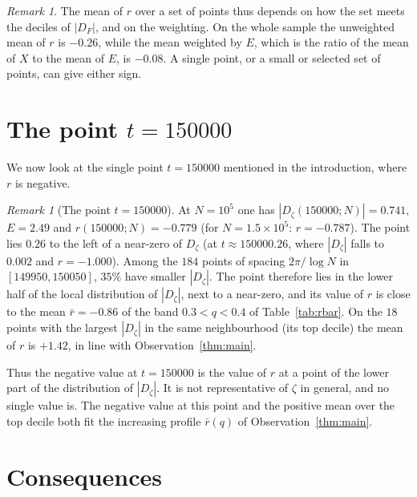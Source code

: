 \documentclass[11pt]{amsart}
\theoremstyle{definition}
\theoremstyle{remark}
\newtheorem{remark}[theorem]{Remark}
\begin{document}
\begin{remark}
The mean of $r$ over a set of points thus depends on how the set meets
the deciles of $|D_F|$, and on the weighting. On the whole sample the
unweighted mean of $r$ is $-0.26$, while the mean weighted by $E$, which
is the ratio of the mean of $X$ to the mean of $E$, is $-0.08$. A single
point, or a small or selected set of points, can give either sign.
\end{remark}

\section{The point \texorpdfstring{$t=150000$}{t=150000}}
\label{sec:150000}

We now look at the single point $t=150000$ mentioned in the
introduction, where $r$ is negative.

\begin{remark}[The point $t=150000$]\label{prop:150000}
At $N=10^5$ one has $|D_\zeta(150000;N)|=0.741$, $E=2.49$ and
$r(150000;N)=-0.779$ (for $N=1.5\times10^5$: $r=-0.787$). The point lies
$0.26$ to the left of a near-zero of $D_\zeta$ (at $t\approx150000.26$,
where $|D_\zeta|$ falls to $0.002$ and $r=-1.000$). Among the $184$ points of
spacing $2\pi/\log N$ in $[149950,150050]$, $35\%$ have smaller
$|D_\zeta|$. The point therefore lies in the lower half of the local
distribution of $|D_\zeta|$, next to a near-zero, and its value of $r$ is
close to the mean $\bar r=-0.86$ of the band $0.3<q<0.4$ of
Table~\ref{tab:rbar}. On the $18$ points with the largest $|D_\zeta|$ in the same
neighbourhood (its top decile) the mean of $r$ is $+1.42$, in line with Observation~\ref{thm:main}.
\end{remark}

Thus the negative value at $t=150000$ is the value of $r$ at a point of
the lower part of the distribution of $|D_\zeta|$. It is not
representative of $\zeta$ in general, and no single value is. The
negative value at this point and the positive mean over the top decile
both fit the increasing profile $\bar r(q)$ of
Observation~\ref{thm:main}.

\section{Consequences}
\label{sec:implications}
\end{document}

